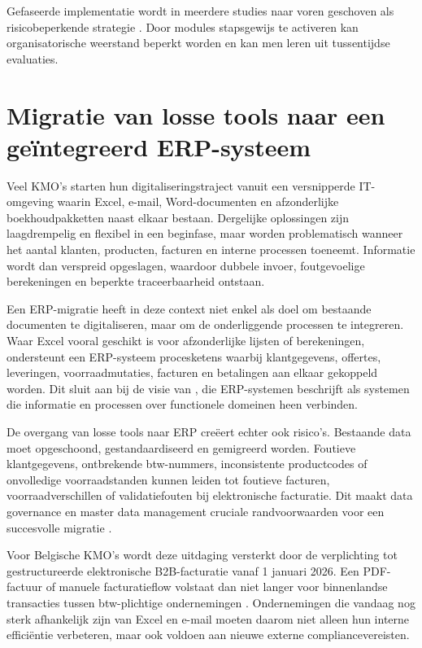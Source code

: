 Gefaseerde implementatie wordt in meerdere studies naar voren geschoven als risicobeperkende strategie \autocite{Aloini2007}. Door modules stapsgewijs te activeren kan organisatorische weerstand beperkt worden en kan men leren uit tussentijdse evaluaties.

\section{Migratie van losse tools naar een geïntegreerd ERP-systeem}

Veel KMO’s starten hun digitaliseringstraject vanuit een versnipperde IT-omgeving waarin Excel, e-mail, Word-documenten en afzonderlijke boekhoudpakketten naast elkaar bestaan. Dergelijke oplossingen zijn laagdrempelig en flexibel in een beginfase, maar worden problematisch wanneer het aantal klanten, producten, facturen en interne processen toeneemt. Informatie wordt dan verspreid opgeslagen, waardoor dubbele invoer, foutgevoelige berekeningen en beperkte traceerbaarheid ontstaan.

Een ERP-migratie heeft in deze context niet enkel als doel om bestaande documenten te digitaliseren, maar om de onderliggende processen te integreren. Waar Excel vooral geschikt is voor afzonderlijke lijsten of berekeningen, ondersteunt een ERP-systeem procesketens waarbij klantgegevens, offertes, leveringen, voorraadmutaties, facturen en betalingen aan elkaar gekoppeld worden. Dit sluit aan bij de visie van \textcite{Davenport1998}, die ERP-systemen beschrijft als systemen die informatie en processen over functionele domeinen heen verbinden.

De overgang van losse tools naar ERP creëert echter ook risico’s. Bestaande data moet opgeschoond, gestandaardiseerd en gemigreerd worden. Foutieve klantgegevens, ontbrekende btw-nummers, inconsistente productcodes of onvolledige voorraadstanden kunnen leiden tot foutieve facturen, voorraadverschillen of validatiefouten bij elektronische facturatie. Dit maakt data governance en master data management cruciale randvoorwaarden voor een succesvolle migratie \autocite{Umble2003}.

Voor Belgische KMO’s wordt deze uitdaging versterkt door de verplichting tot gestructureerde elektronische B2B-facturatie vanaf 1 januari 2026. Een PDF-factuur of manuele facturatieflow volstaat dan niet langer voor binnenlandse transacties tussen btw-plichtige ondernemingen \autocite{BelgiumEInvoice_2026}. Ondernemingen die vandaag nog sterk afhankelijk zijn van Excel en e-mail moeten daarom niet alleen hun interne efficiëntie verbeteren, maar ook voldoen aan nieuwe externe compliancevereisten.

